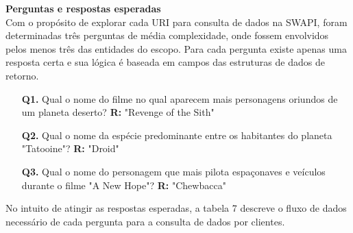 \textbf{Perguntas e respostas esperadas} \\

Com o propósito de explorar cada URI para consulta de dados na SWAPI, foram determinadas três perguntas de média complexidade, onde fossem envolvidos pelos menos três das entidades do escopo. Para cada pergunta existe apenas uma resposta certa e sua lógica é baseada em campos das estruturas de dados de retorno.

\begin{enumerate}
\item[\textbf{Q1.}] Qual o nome do filme no qual aparecem mais personagens oriundos de um planeta deserto? \textbf{R:} "Revenge of the Sith"
\item[\textbf{Q2.}] Qual o nome da espécie predominante entre os habitantes do planeta "Tatooine"? \textbf{R:} "Droid"
\item[\textbf{Q3.}] Qual o nome do personagem que mais pilota espaçonaves e veículos durante o filme "A New Hope"? \textbf{R:} "Chewbacca"
\end{enumerate}

No intuito de atingir as respostas esperadas, a tabela 7 descreve o fluxo de dados necessário de cada pergunta para a consulta de dados por clientes.

